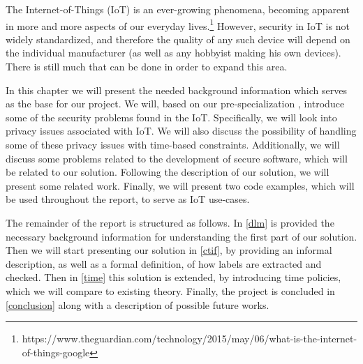 
The Internet-of-Things (IoT) is an ever-growing phenomena, becoming apparent in more and more aspects of our everyday lives.\footnote{https://www.theguardian.com/technology/2015/may/06/what-is-the-internet-of-things-google}
However, security in IoT is not widely standardized, and therefore the quality of any such device will depend on the individual manufacturer (as well as any hobbyist making his own devices).
There is still much that can be done in order to expand this area.

In this chapter we will present the needed background information which serves as the base for our project.
We will, based on our pre-specialization \cite{prespecialization}, introduce some of the security problems found in the IoT.
Specifically, we will look into privacy issues associated with IoT.
We will also discuss the possibility of handling some of these privacy issues with time-based constraints.
Additionally, we will discuss some problems related to the development of secure software, which will be related to our solution.
Following the description of our solution, we will present some related work.
Finally, we will present two code examples, which will be used throughout the report, to serve as IoT use-cases.

The remainder of the report is structured as follows.
In \cref{dlm} is provided the necessary background information for understanding the first part of our solution.
Then we will start presenting our solution in \cref{ctif}, by providing an informal description, as well as a formal definition, of how labels are extracted and checked.
Then in \cref{time} this solution is extended, by introducing time policies, which we will compare to existing theory.
Finally, the project is concluded in \cref{conclusion} along with a description of possible future works.
